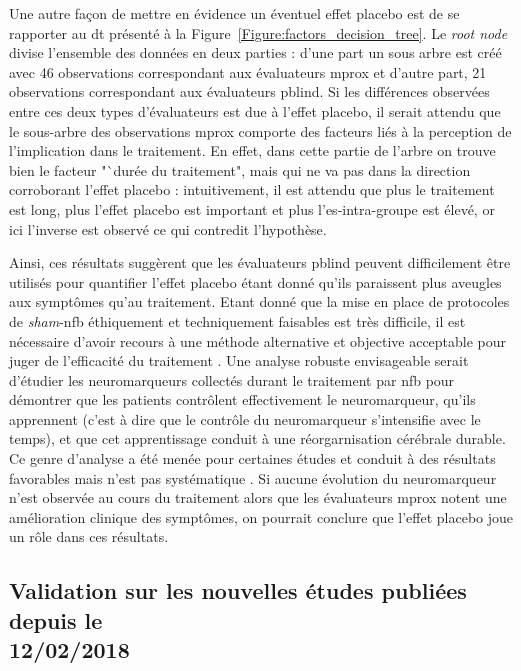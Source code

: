 Une autre façon de mettre en évidence un éventuel effet placebo est de se rapporter au \gls{dt} présenté à la Figure~\ref{Figure:factors_decision_tree}. Le 
\textit{root node} divise l'ensemble des données en deux parties : d'une part un sous arbre est créé avec 46 observations correspondant aux évaluateurs
\gls{mprox} et d'autre part, 21 observations correspondant aux évaluateurs \gls{pblind}. Si les différences observées entre ces deux types d'évaluateurs est due à l'effet
placebo, il serait attendu que le sous-arbre des observations \gls{mprox} comporte des facteurs liés à la perception de l'implication dans le traitement. En effet, dans cette
partie de l'arbre on trouve bien le facteur "`durée du traitement", mais qui ne va pas dans la direction corroborant l'effet placebo : intuitivement, 
il est attendu que plus le traitement est long, plus l'effet placebo est important et plus l'\gls{es}-intra-groupe est élevé, or ici l'inverse est observé ce qui
contredit l'hypothèse. 

Ainsi, ces résultats suggèrent que les évaluateurs \gls{pblind} peuvent difficilement être utilisés pour quantifier l'effet placebo étant donné qu'ils paraissent
plus aveugles aux symptômes qu'au traitement. Etant donné que la mise en place de protocoles de \textit{sham}-\gls{nfb} éthiquement \citep{Holtmann2014} et techniquement 
\citep{Birbaumer1991} faisables est très difficile, il est nécessaire d'avoir recours à une méthode alternative et objective acceptable pour juger de l'efficacité du traitement 
\citep{World-Medical-Association2000}. Une analyse robuste envisageable serait d'étudier les neuromarqueurs collectés durant le traitement par \gls{nfb} pour démontrer que les 
patients contrôlent effectivement le neuromarqueur, qu'ils apprennent (c'est à dire que le contrôle du neuromarqueur s'intensifie avec le temps), et que cet apprentissage conduit 
à une réorgarnisation cérébrale durable. Ce genre d'analyse a été menée pour certaines études et conduit à des résultats favorables mais n'est pas 
systématique \citep{Arns2014}. Si aucune évolution du neuromarqueur n'est observée au cours du traitement alors que les évaluateurs \gls{mprox} notent une amélioration clinique 
des symptômes, on pourrait conclure que l'effet placebo joue un rôle dans ces résultats.

\subsection{Validation sur les nouvelles études publiées depuis le \\ 12/02/2018}

